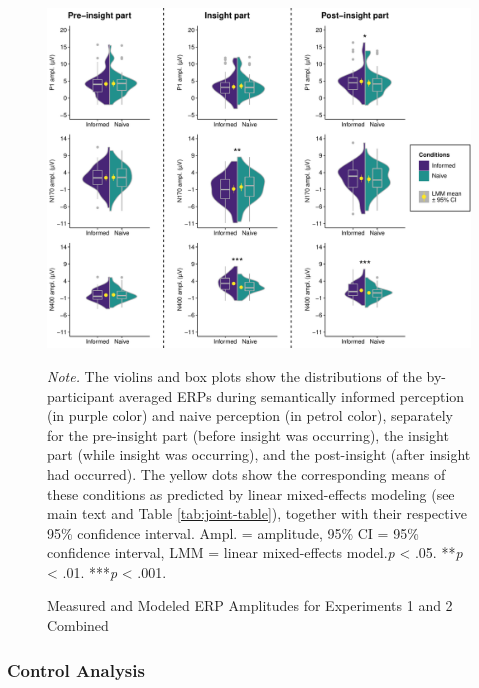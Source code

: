 \documentclass[
  english,
  doc,12pt,twoside,floatsintext]{apa7}
\begin{document}
\begin{figure}

\caption{Measured and Modeled ERP Amplitudes for Experiments 1 and 2 Combined\smallskip}\label{fig:joint-plot}

{\centering \includegraphics[width=1\linewidth]{master_thesis_files/figure-latex/joint-plot-1} 

}

\bigskip\small\textit{Note.} 
The violins and box plots show the distributions of the by-participant averaged ERPs during semantically informed perception (in purple color) and naive perception (in petrol color), separately for the pre-insight part (before insight was occurring), the insight part (while insight was occurring), and the post-insight (after insight had occurred). The yellow dots show the corresponding means of these conditions as predicted by linear mixed-effects modeling (see main text and Table \ref{tab:joint-table}), together with their respective 95\% confidence interval. Ampl. = amplitude, 95\% CI = 95\% confidence interval, LMM = linear mixed-effects model.\newline*\textit{p} \textless{} .05. **\textit{p} \textless{} .01. ***\textit{p} \textless{} .001.

\end{figure}

\hypertarget{control-analysis}{%
\subsubsection{Control Analysis}\label{control-analysis}}
\end{document}
